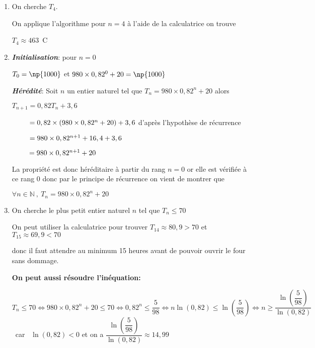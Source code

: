 \documentclass[11pt,a4paper,answers,fancyhdr]{exam}
\newcommand{\equi}{\Longleftrightarrow}
\newcommand{\pp}{\leqslant}
\newcommand{\pg}{\geqslant}
\newcommand{\N}{\mathbb{N}}
\begin{document}
\begin{enumerate}
\item %

\begin{solution}
On cherche $T_4$. 

On applique l'algorithme pour $n = 4$ à l'aide de la calculatrice on trouve 

$T_4\approx 463$~\degres C
\end{solution}

\item %

\begin{solution}

\textbf{\emph{Initialisation}}: pour $n=0$
	
	$T_0=\np{1000}$ et $980 \times 0,82^0 + 20=\np{1000}$
	
\vspace{0.3cm}
	
\textbf{\emph{Hérédité}}: Soit $n$ un entier naturel tel que $T_n=980 \times 0,82^n + 20$
		alors 
		
$T_{n+1}=0,82T_n+3,6$
	
$\hphantom{T_{n+1}}=0,82\times \left( 980 \times 0,82^n + 20\right) +3,6$ d'après l'hypothèse de récurrence 
	
$\hphantom{T_{n+1}}=980 \times 0,82^{n+1} + 16,4+3,6 $
		
$\hphantom{T_{n+1}}=980 \times 0,82^{n+1} + 20 $
			
La propriété est donc héréditaire à partir du rang $n = 0$ or elle est vérifiée à ce rang 0 donc par le principe de récurrence on vient de montrer que 
	
$\forall n \in \N~,~T_n=980 \times 0,82^n + 20$
	
\end{solution}

\item  %

\begin{solution}

On cherche le plus petit entier naturel $n$ tel que $T_n\pp70$

On peut utiliser la calculatrice pour trouver $T_{14}\approx 80,9 >70$ et $T_{15}\approx 69,9 <70$

donc il faut attendre au minimum 15 heures avant de pouvoir ouvrir le four sans dommage.

\vspace{0.2cm}
\textbf{On peut aussi résoudre l'inéquation:} 

$T_n\pp70\equi980 \times 0,82^n + 20 \pp 70 \equi0,82^n \pp \dfrac{5}{98} \equi n\ln(0,82) \pp \ln\left( \dfrac{5}{98}\right) \equi n \pg \dfrac{\ln\left( \dfrac{5}{98}\right)}{\ln(0,82)}$ ~car~ $\ln(0,82)<0$ et on a $\dfrac{\ln\left( \dfrac{5}{98}\right)}{\ln(0,82)}\approx 14,99$
\end{solution}

\end{enumerate}
 
\end{document}
